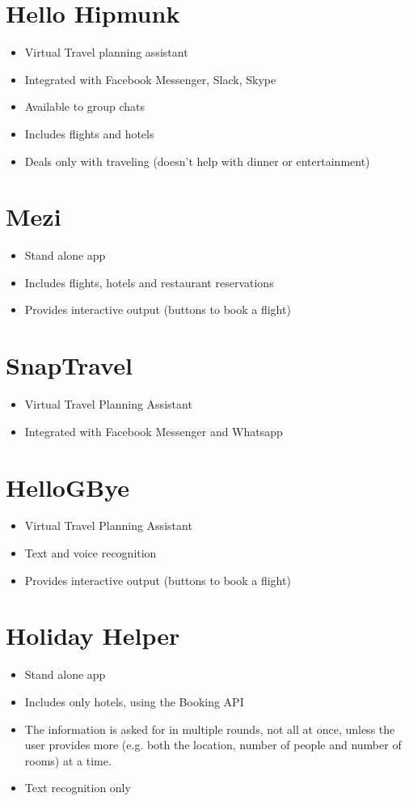 \documentclass[runningheads,a4paper,11pt]{report}
\begin{document}
\section*{Hello Hipmunk}
\begin{itemize}
	\item Virtual Travel planning assistant
	\item Integrated with Facebook Messenger, Slack, Skype
	\item Available to group chats
	\item Includes flights and hotels
	\item Deals only with traveling (doesn't help with dinner or entertainment)
\end{itemize}

\section*{Mezi}
\begin{itemize}
	\item Stand alone app
	\item Includes flights, hotels and restaurant reservations	
	\item Provides interactive output (buttons to book a flight)
\end{itemize}

\section*{SnapTravel}
\begin{itemize}
\item Virtual Travel Planning Assistant
\item Integrated with Facebook Messenger and Whatsapp
\end{itemize}

\section*{HelloGBye}
\begin{itemize}
\item Virtual Travel Planning Assistant
\item Text and voice recognition	
\item Provides interactive output (buttons to book a flight)
\end{itemize}

\section*{Holiday Helper}
\begin{itemize}
	\item Stand alone app
	\item Includes only hotels, using the Booking API
	\item The information is asked for in multiple rounds, not all at once, unless the user provides more (e.g. both the location, number of people and number of rooms) at a time.
	\item Text recognition only
\end{itemize}
\end{document}

